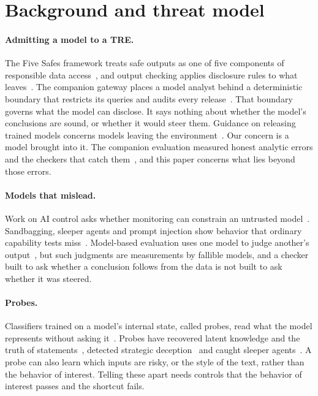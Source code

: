 \section{Background and threat model}
\label{sec:background}

\paragraph{Admitting a model to a TRE.}
The Five Safes framework treats safe outputs as one of five components of responsible data access~\cite{fivesafes,ritchie2017fivesafes}, and output checking applies disclosure rules to what leaves~\cite{hundepool2012,griffiths2019handbook}. The companion gateway places a model analyst behind a deterministic boundary that restricts its queries and audits every release~\cite{wade2026safetre}. That boundary governs what the model can disclose. It says nothing about whether the model's conclusions are sound, or whether it would steer them. Guidance on releasing trained models concerns models leaving the environment~\cite{jefferson2022graimatter}. Our concern is a model brought into it. The companion evaluation measured honest analytic errors and the checkers that catch them~\cite{wade2026opacity}, and this paper concerns what lies beyond those errors.

\paragraph{Models that mislead.}
Work on AI control asks whether monitoring can constrain an untrusted model~\cite{greenblatt2024control}. Sandbagging, sleeper agents and prompt injection show behavior that ordinary capability tests miss~\cite{vanderweij2024sandbagging,hubinger2024sleeper,greshake2023}. Model-based evaluation uses one model to judge another's output~\cite{zheng2023judge}, but such judgments are measurements by fallible models, and a checker built to ask whether a conclusion follows from the data is not built to ask whether it was steered.

\paragraph{Probes.}
Classifiers trained on a model's internal state, called probes, read what the model represents without asking it~\cite{alain2017probes,belinkov2022probing}. Probes have recovered latent knowledge and the truth of statements~\cite{burns2023latent,marks2024geometry,zou2023repe}, detected strategic deception~\cite{goldowskydill2025probes} and caught sleeper agents~\cite{macdiarmid2024sleeperprobes}. A probe can also learn which inputs are risky, or the style of the text, rather than the behavior of interest. Telling these apart needs controls that the behavior of interest passes and the shortcut fails.

